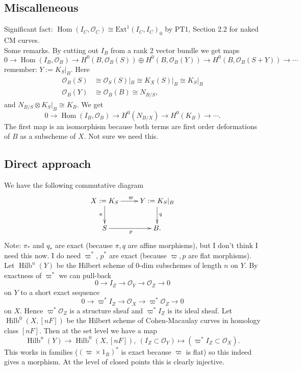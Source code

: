 \documentclass{amsart}
\theoremstyle{definition}
\renewcommand{\O}{\mathcal{O}}
\newcommand{\Hom}{\operatorname{Hom}}
\newcommand{\Hilb}{\operatorname{Hilb}}
\begin{document}
\subsection{Miscalleneous} Significant fact: $\Hom(I_C,\O_C) \cong \mathrm{Ext}^1(I_C,I_C)_0$ by PT1, Section 2.2 for naked CM curves. \\

Some remarks. By cutting out $I_B$ from a rank 2 vector bundle we get maps
\[
0 \rightarrow \Hom(I_B, \O_B) \rightarrow H^0(B,\O_B(S)) \oplus H^0(B,\O_B(Y)) \rightarrow H^0(B,\O_B(S+Y)) \rightarrow \cdots
\]
remember: $Y := K_S|_B$. Here 
\begin{align*}
\O_B(S) &\cong \O_S(S) |_{B} \cong K_X (S) |_B \cong K_S |_B \\
\O_B(Y) &\cong \O_B(B) \cong N_{B/S},
\end{align*}
and $N_{B/S} \otimes K_S|_B \cong K_B$. We get
 \[
0 \rightarrow \Hom(I_B, \O_B) \rightarrow H^0(N_{B/X}) \rightarrow H^0(K_B) \rightarrow \cdots.
\]
The first map is an isomorphism because both terms are first order deformations of $B$ as a subscheme of $X$. Not sure we need this.

\subsection{Direct approach}

We have the following commutative diagram
\begin{displaymath}
\xymatrix
{
X:=K_S \ar^{\varpi}[r] \ar_{\pi}[d] & Y:=K_S|_B \ar^{q}[d] \\
S \ar_{p}[r] & B.
}
\end{displaymath}
Note: $\pi_*$ and $q_*$ are exact (because $\pi, q$ are affine morphisms), but I don't think I need this now. I do need $\varpi^*$, $p^*$ are exact (because $\varpi, p$ are flat morphisms). Let $\Hilb^n(Y)$ be the Hilbert scheme of 0-dim subschemes of length $n$ on $Y$. By exactness of $\varpi^*$ we can pull-back
$$
0 \rightarrow I_Z \rightarrow \O_Y \rightarrow \O_Z \rightarrow 0
$$
on $Y$ to a short exact sequence
$$
0 \rightarrow \varpi^* I_Z \rightarrow \O_X \rightarrow \varpi^* \O_Z \rightarrow 0
$$
on $X$. Hence $\varpi^* \O_Z$ is a structure sheaf and $\varpi^* I_Z$ is its ideal sheaf. Let $\Hilb^0(X, [nF])$ be the Hilbert scheme of Cohen-Macaulay curves in homology class $[nF]$. Then at the set level we have a map
$$
\Hilb^n(Y) \rightarrow \Hilb^0(X,[nF]), \ (I_Z \subset \O_Y) \mapsto (\varpi^* I_Z \subset \O_X).
$$
This works in families ($(\varpi \times 1_B)^*$ is exact because $\varpi$ is flat) so this indeed gives a morphism. At the level of closed points this is clearly injective.
\end{document}
